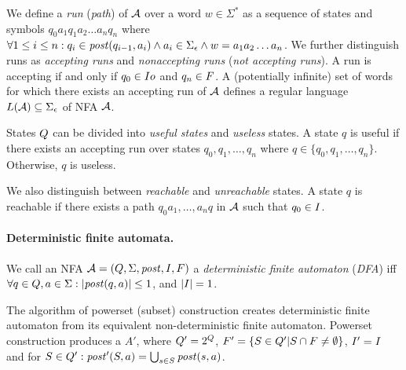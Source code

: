 We define a \emph{run} (\emph{path}) of $\mathcal{A}$ over a word $w \in \Sigma^*$ as a sequence of states and symbols $q_0a_1q_1a_2\ldots a_nq_n$ where $\forall 1 \leq i \leq n: q_i \in \mathit{post}(q_{i-1}, a_i) \land a_i \in \Sigma_\epsilon \land w = a_1a_2\ldots a_n$.
We further distinguish runs as \emph{accepting runs} and \emph{nonaccepting runs} (\emph{not accepting runs}).
A run is accepting if and only if $q_0 \in I  o$ and $q_n \in F$.
A (potentially infinite) set of words for which there exists an accepting run of $\mathcal{A}$ defines a regular language $L(\mathcal{A}) \subseteq \Sigma_\epsilon$ of NFA $\mathcal{A}$.

States $Q$ can be divided into \emph{useful states} and \emph{useless} states.
A state $q$ is useful if there exists an accepting run over states $q_0, q_1, \ldots, q_n$ where $q \in \{ q_0, q_1, \ldots, q_n \}$.
Otherwise, $q$ is useless.

We also distinguish between \emph{reachable} and \emph{unreachable} states.
A state $q$ is reachable if there exists a path $q_0a_1, \ldots, a_nq$ in $\mathcal{A}$ such that $q_0 \in I$.


\paragraph{Deterministic finite automata.}
We call an NFA $\mathcal{A} = (Q, \Sigma
, \mathit{post}, I, F)$ a \emph{deterministic finite automaton} (\emph{DFA}) iff $\forall q \in Q, a \in \Sigma: |\mathit{post}(q, a)| \leq 1
$, and $|I| = 1$.

\begin{definition} \hfill \newline
    The algorithm of powerset (subset) construction creates deterministic finite automaton from its equivalent non-deterministic finite automaton. Powerset construction produces a \dfa $A'$, where $Q' = 2^Q$, $F' = \{S \in Q' | S \cap F \neq \emptyset\}$, $I' = I$ and for $S \in Q': \mathit{post}'(S, a) = \bigcup_{s \in S} \mathit{post}(s, a)$.
\end{definition}

